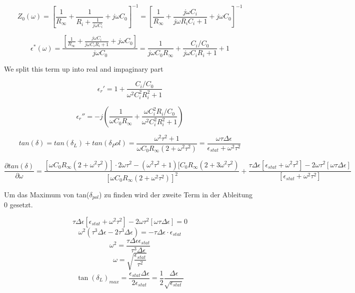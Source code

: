 \begin{equation}
Z_0(\omega)=[\frac{1}{R_\infty}+\frac{1}{R_i+\frac{1}{j \omega C_i}}+j \omega C_0]^{-1} = [\frac{1}{R_\infty}+\frac{j \omega C_i}{j\omega R_i  C_i+1}+j \omega C_0]^{-1}
\end{equation}

\begin{equation}
\epsilon^*(\omega)= \frac{[\frac{1}{R_\infty}+\frac{j \omega C_i}{j\omega C_i R_i  +1}+j \omega C_0]}{j \omega C_0} = \frac{1}{j \omega C_0 R_\infty}+ \frac{C_i/C_0}{j\omega C_i R_i  +1}+1
\end{equation}

We split this term up into real and impaginary part 

\begin{equation}
\epsilon_r' = 1+ \frac{C_i/C_0}{\omega^2 C_i^2 R_i^2 +1}
\end{equation}

\begin{equation}
\epsilon_r'' = -j \left(\frac{1}{\omega C_0 R_\infty}+\frac{\omega C_i^2 R_i / C_0}{\omega^2 C_i^2 R_i^2 +1} \right)
\end{equation}

\begin{equation}
tan(\delta) = tan(\delta_L) + tan( \delta_Pol) = \frac{\omega^2 \tau^2+1}{\omega C_0 R_\infty (2+ \omega^2 \tau^2)}=\frac{\omega \tau \Delta \epsilon}{\epsilon_{stat} + \omega^2 \tau^2}
\end{equation}

\begin{equation}
\frac{\partial tan(\delta)}{ \partial \omega} = \frac{[\omega C_0 R_\infty (2+\omega^2 \tau^2)]\cdot 2 \omega \tau^2 - (\omega^2 \tau^2 +1) [C_0 R_\infty (2+3 \omega^2 \tau^2)  }{[\omega C_0 R_\infty (2+\omega^2 \tau^2)]^2}+ \frac{\tau \Delta \epsilon [\epsilon_{stat} + \omega^2 \tau^2] - 2 \omega \tau^2 [\omega \tau \Delta \epsilon]}{[\epsilon_{stat} +\omega^2 \tau^2]}
\end{equation}

Um das Maximum von tan($\delta_{pol}$) zu finden wird der zweite Term in der Ableitung 0 gesetzt.

\begin{equation}
\tau \Delta \epsilon [\epsilon_{stat} + \omega^2 \tau^2] -2\omega \tau^2 [\omega \tau \Delta \epsilon] = 0
\end{equation}
\begin{equation}
\omega^2 (\tau^3 \Delta \epsilon -2 \tau^3 \Delta \epsilon) = - \tau \Delta \epsilon \cdot \epsilon_{stat}
\end{equation}
\begin{equation}
\omega^2 = \frac{\tau \Delta \epsilon \epsilon_{stat}}{\tau^3 \Delta \epsilon}
\end{equation}
\begin{equation}
\omega = \sqrt{\frac{\epsilon_{stat}}{\tau^2}}
\end{equation}
\begin{equation}
\tan(\delta_L)_{max} = \frac{\epsilon_{stat} \Delta\epsilon}{2\epsilon_{stat}} = \frac{1}{2} \frac{\Delta \epsilon}{\sqrt{\epsilon_{stat}}}
\end{equation}


